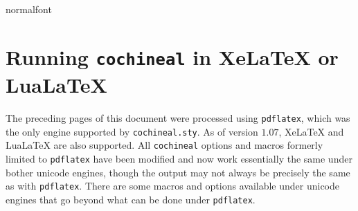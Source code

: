 \documentclass[11pt]{article}
\begin{document}
\expandafter\show\csname normalfont \endcsname
\setcounter{page}{8}
\section*{Running {\tt cochineal} in XeLaTeX or LuaLaTeX}
The preceding pages of this document were processed using {\tt pdflatex}, which was the only engine supported by {\tt cochineal.sty}. As of version $1.07$, XeLaTeX and LuaLaTeX are also supported. All {\tt cochineal} options and macros formerly limited to {\tt pdflatex} have been modified and now work essentially the same under bother unicode engines, though the output may not always be precisely the same as with {\tt pdflatex}. There are some macros and options available under unicode engines that go beyond what can be done under {\tt pdflatex}.
\end{document}
